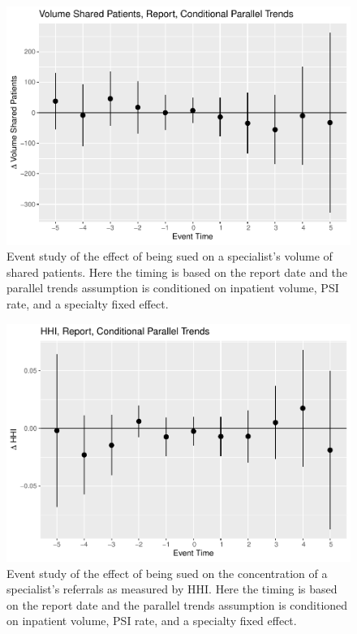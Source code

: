\documentclass[
  12pt,
]{article}
\begin{document}
\FloatBarrier

\begin{figure}
\centering
\includegraphics{Paper_files/figure-latex/volrepestud-1.pdf}
\caption{\label{fig:volrepestud}Event study of the effect of being sued on a specialist's volume of shared patients. Here the timing is based on the report date and the parallel trends assumption is conditioned on inpatient volume, PSI rate, and a specialty fixed effect.}
\end{figure}

\FloatBarrier

\begin{figure}
\centering
\includegraphics{Paper_files/figure-latex/hhirepestud-1.pdf}
\caption{\label{fig:hhirepestud}Event study of the effect of being sued on the concentration of a specialist's referrals as measured by HHI. Here the timing is based on the report date and the parallel trends assumption is conditioned on inpatient volume, PSI rate, and a specialty fixed effect.}
\end{figure}
\end{document}
